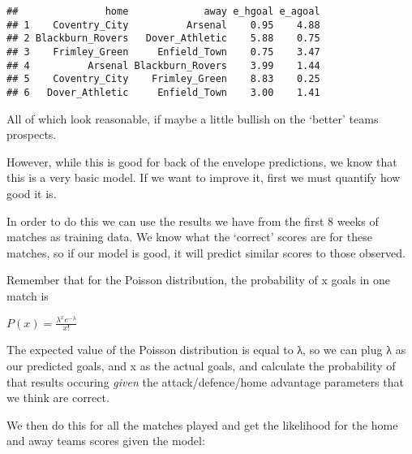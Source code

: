 \documentclass[]{article}
\newenvironment{Shaded}{\begin{snugshade}}{\end{snugshade}}
\newcommand{\KeywordTok}[1]{\textcolor[rgb]{0.13,0.29,0.53}{\textbf{#1}}}
\newcommand{\DataTypeTok}[1]{\textcolor[rgb]{0.13,0.29,0.53}{#1}}
\newcommand{\DecValTok}[1]{\textcolor[rgb]{0.00,0.00,0.81}{#1}}
\newcommand{\StringTok}[1]{\textcolor[rgb]{0.31,0.60,0.02}{#1}}
\newcommand{\CommentTok}[1]{\textcolor[rgb]{0.56,0.35,0.01}{\textit{#1}}}
\newcommand{\OperatorTok}[1]{\textcolor[rgb]{0.81,0.36,0.00}{\textbf{#1}}}
\newcommand{\NormalTok}[1]{#1}
\begin{document}
\begin{verbatim}
##               home             away e_hgoal e_agoal
## 1    Coventry_City          Arsenal    0.95    4.88
## 2 Blackburn_Rovers   Dover_Athletic    5.88    0.75
## 3    Frimley_Green     Enfield_Town    0.75    3.47
## 4          Arsenal Blackburn_Rovers    3.99    1.44
## 5    Coventry_City    Frimley_Green    8.83    0.25
## 6   Dover_Athletic     Enfield_Town    3.00    1.41
\end{verbatim}

All of which look reasonable, if maybe a little bullish on the `better'
teams prospects.

However, while this is good for back of the envelope predictions, we
know that this is a very basic model. If we want to improve it, first we
must quantify how good it is.

In order to do this we can use the results we have from the first 8
weeks of matches as training data. We know what the `correct' scores are
for these matches, so if our model is good, it will predict similar
scores to those observed.

Remember that for the Poisson distribution, the probability of x goals
in one match is

\(P(x) = \frac{\lambda^{x}e^{-\lambda}}{x!}\)

The expected value of the Poisson distribution is equal to λ, so we can
plug λ as our predicted goals, and x as the actual goals, and calculate
the probability of that results occuring \emph{given} the
attack/defence/home advantage parameters that we think are correct.

We then do this for all the matches played and get the likelihood for
the home and away teams scores given the model:

\begin{Shaded}
\end{Shaded}
\end{document}
